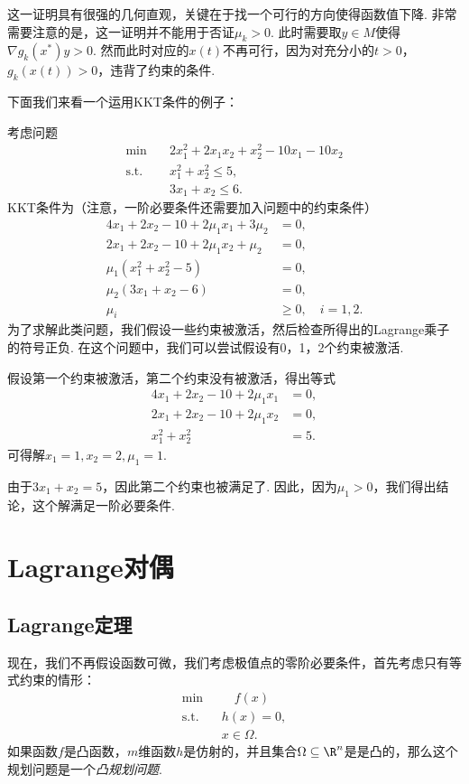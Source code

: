 \begin{remark}
这一证明具有很强的几何直观，关键在于找一个可行的方向使得函数值下降. 非常需要注意的是，这一证明并不能用于否证$\mu_k>0$. 此时需要取${y}\in M$使得$\nabla g_k({x^\ast})y>0$. 然而此时对应的$x(t)$不再可行，因为对充分小的$t>0$，$g_k(x(t))>0$，违背了约束的条件.
\end{remark}

下面我们来看一个运用KKT条件的例子：
\begin{example}
考虑问题
\begin{align*}
    \min \quad &2x_1^2+2x_1x_2+x_2^2-10x_1-10x_2 \\
    \text{s.t.}\quad &x_1^2+x_2^2\leq 5, \\
    & 3x_1+x_2\leq 6.
\end{align*}
KKT条件为（注意，一阶必要条件还需要加入问题中的约束条件）
\begin{align*}
    4x_1+2x_2-10+2\mu_1x_1+3\mu_2&=0, \\
    2x_1+2x_2-10+2\mu_1x_2+\mu_2&=0, \\
    \mu_1(x_1^2+x_2^2-5)&=0, \\
    \mu_2(3x_1+x_2-6)&=0,\\
    \mu_i&\ge 0,\quad i=1,2.
\end{align*}
为了求解此类问题，我们假设一些约束被激活，然后检查所得出的Lagrange乘子的符号正负. 在这个问题中，我们可以尝试假设有0，1，2个约束被激活. 

假设第一个约束被激活，第二个约束没有被激活，得出等式
\begin{align*}
4x_1+2x_2-10+2\mu_1x_1&=0, \\
2x_1+2x_2-10+2\mu_1x_2&=0, \\
x_1^2+x_2^2&=5.
\end{align*}
可得解$x_1=1,x_2=2,\mu_1=1.$

由于$3x_1+x_2=5$，因此第二个约束也被满足了. 因此，因为$\mu_1 > 0$，我们得出结论，这个解满足一阶必要条件. 
\end{example}

\section{Lagrange对偶}
\subsection{Lagrange定理}
现在，我们不再假设函数可微，我们考虑极值点的零阶必要条件，首先考虑只有等式约束的情形：
    \begin{equation}
          \begin{aligned}
        \min&\quad f({x}) \\
        \text{s.t.}\quad& {h(x)=0}, \\
        &{x}\in\Omega.
        \end{aligned}\label{eq:eq-zero-cond}
    \end{equation}
如果函数$f$是凸函数，$m$维函数${h}$是仿射的，并且集合$\Omega\subseteq \R^n$是是凸的，那么这个规划问题是一个\emph{凸规划问题}. 

